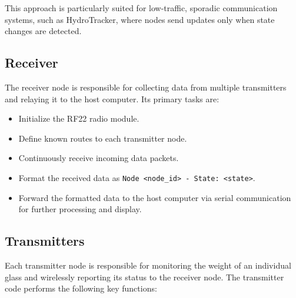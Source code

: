 This approach is particularly suited for low-traffic, sporadic communication systems, such as HydroTracker, where nodes send updates only when state changes are detected. 

\subsection{Receiver}
The receiver node is responsible for collecting data from multiple transmitters and relaying it to the host computer.
Its primary tasks are:

\begin{itemize}
    \item Initialize the RF22 radio module.
    \item Define known routes to each transmitter node.
    \item Continuously receive incoming data packets.
    \item Format the received data as \texttt{Node <node\_id> - State: <state>}.
    \item Forward the formatted data to the host computer via serial communication for further processing and display.
\end{itemize}

\subsection{Transmitters}
Each transmitter node is responsible for monitoring the weight of an individual glass and wirelessly reporting its status to the receiver node.
The transmitter code performs the following key functions:

